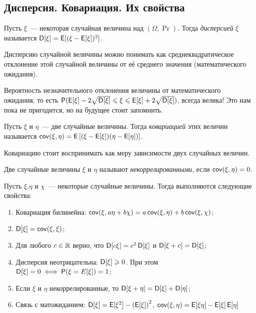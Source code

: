 \subsection{Дисперсия. Ковариация. Их свойства}
\begin{definition}
    Пусть \(\xi\)~--- некоторая случайная величина над \((\Omega, \Pr)\). Тогда \emph{дисперсией} \(\xi\) называется \(\operatorname{\mathsf{D}}[\xi] = \operatorname{\mathsf{E}}[(\xi-\operatorname{\mathsf{E}}[\xi])^2]\). 
\end{definition}
Дисперсию случайной величины можно понимать как среднеквадратическое отклонение этой случайной величины от её среднего значения (математического ожидания).
\begin{remark}
    Вероятность незначительного отклонения величины от математического ожидания, то есть \(\operatorname{\mathsf{P}}(\operatorname{\mathsf{E}}[\xi] - 2\sqrt{\operatorname{\mathsf{D}}[\xi]} \leqslant \xi \leqslant \operatorname{\mathsf{E}}[\xi] + 2\sqrt{\operatorname{\mathsf{D}}[\xi]})\), всегда велика! Это нам пока не пригодится, но на будущее стоит запомнить.
\end{remark}
\begin{definition}
    Пусть \(\xi\) и \(\eta\)~--- две случайные величины. Тогда \emph{ковариацией} этих величин называется \(\operatorname{\mathsf{cov}}(\xi, \eta) = \operatorname{\mathsf{E}}\left[(\xi - \operatorname{\mathsf{E}}[\xi])(\eta-\operatorname{\mathsf{E}}[\eta])\right]\).
\end{definition}
Ковариацию стоит воспринимать как меру зависимости двух случайных величин.
\begin{definition}
    Две случайные величины \(\xi\) и \(\eta\) называют \emph{некоррелированными}, если \(\operatorname{\mathsf{cov}}(\xi, \eta) = 0\).
\end{definition}
\begin{theorem}
    Пусть \(\xi\),\(\eta\) и \(\chi\)~--- некоторые случайные величины. Тогда выполняются следующие свойства:
    \begin{enumerate}
        \item Ковариация билинейна: \(\operatorname{\mathsf{cov}}(\xi, a\eta + b\chi) = a\operatorname{\mathsf{cov}}(\xi, \eta) + b\operatorname{\mathsf{cov}}(\xi, \chi)\);
        \item \(\operatorname{\mathsf{D}}[\xi] = \operatorname{\mathsf{cov}}(\xi, \xi)\);
        \item Для любого \(c \in \mathbb{R}\) верно, что \(\operatorname{\mathsf{D}}[c\xi] = c^2\operatorname{\mathsf{D}}[\xi]\) и \(\operatorname{\mathsf{D}}[\xi + c] = \operatorname{\mathsf{D}}[\xi]\);
        \item Дисперсия неотрицательна: \(\operatorname{\mathsf{D}}[\xi] \geqslant 0\). При этом \(\operatorname{\mathsf{D}}[\xi] = 0 \iff \operatorname{\mathsf{P}}(\xi = E[\xi]) = 1\);
        \item Если \(\xi\) и \(\eta\) некоррелированные, то \(\operatorname{\mathsf{D}}[\xi + \eta] = \operatorname{\mathsf{D}}[\xi] + \operatorname{\mathsf{D}}[\eta]\);
        \item Связь с матожиданием: \(\operatorname{\mathsf{D}}[\xi] = \operatorname{\mathsf{E}}[\xi^2] - \left(\operatorname{\mathsf{E}}[\xi]\right)^2\), \(\operatorname{\mathsf{cov}}(\xi, \eta) = \operatorname{\mathsf{E}}[\xi\eta] - \operatorname{\mathsf{E}}[\xi]\operatorname{\mathsf{E}}[\eta]\)
    \end{enumerate}
\end{theorem}
